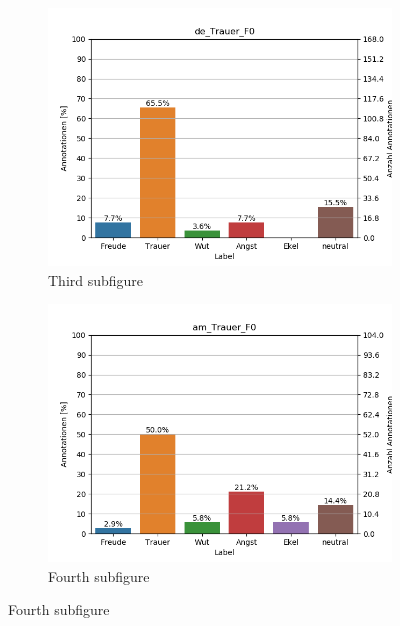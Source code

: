 \documentclass[11pt,a4paper,headsepline,twoside,toc=bibliography]{scrreprt}
\begin{document}
\begin{figure}[t!]
	\medskip
	\begin{subfigure}{0.48\textwidth}
		\includegraphics[width=\linewidth]{plots/de_Trauer_F0.png}
		\caption{Third subfigure} \label{fig:de_T_F0}
	\end{subfigure}\hspace*{\fill}
	\begin{subfigure}{0.48\textwidth}
		\includegraphics[width=\linewidth]{plots/am_Trauer_F0.png}
		\caption{Fourth subfigure} \label{fig:am_T_F0}
	\end{subfigure}
	

\end{figure}
\end{document}
